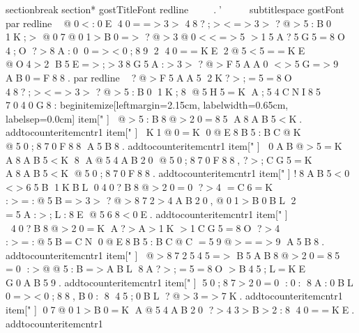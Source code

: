 
 
 
 
 \ s e c t i o n b r e a k   \ s e c t i o n * { 
 
 	 \ g o s t T i t l e F o n t 
 
 	 \ r e d l i n e 
 
 	 .'
 
 } 
 
 
 
 
 
 
 
 \ s u b t i t l e s p a c e 
 
 
 
 { \ g o s t F o n t 
 
 	 \ p a r   \ r e d l i n e     @0<:0E  40==>3>  48?;><=>3>  ?@>5:B0  1K;>  @07@01>B0=>  ?@>3@0<<=>5  >15A?5G5=8O  4;O  ?>8A:0  0=><0;89  2  40==KE  2@5<5==KE  @O4>2  B5E=>;>38G5A:>3>  ?@>F5AA0  <>5G=>9  AB0=F88.   
 
 	 \ p a r   \ r e d l i n e     ?@>F5AA5  2K?>;=5=8O  48?;><=>3>  ?@>5:B0  1K;8  @5H5=K  A;54CNI85  7040G8: 
 
 	 
 
 	 \ b e g i n { i t e m i z e } [ l e f t m a r g i n = 2 . 1 5 c m ,   l a b e l w i d t h = 0 . 6 5 c m ,   l a b e l s e p = 0 . 0 c m ]   
 
 	 	 
 
 	 	 \ i t e m [ "   ]   @>5:B8@>20=85  A8AB5<K. 	 	 
 
 	 	 \ a d d t o c o u n t e r { i t e m c n t r } { 1 } 
 
 	 	 
 
 	 	 \ i t e m [ "   ]   K1@0=K  0@E8B5:BC@K  @50;870F88  A5B8. 	 	 
 
 	 	 \ a d d t o c o u n t e r { i t e m c n t r } { 1 } 
 
 	 	 
 
 	 	 \ i t e m [ "   ]   0AB@>5=K  A8AB5<K  8  A@54AB20  @50;870F88,   ?>;CG5=K  A8AB5<K  @50;870F88.   	 	 
 
 	 	 \ a d d t o c o u n t e r { i t e m c n t r } { 1 } 
 
 	 	 
 
 	 	 \ i t e m [ "   ]   !8AB5<0  <>65B  1KBL  040?B8@>20=0  ?>4  =C6=K  :>=:@5B=>3>  ?@>872>4AB20,   @01>B0BL  2  =5A:>;L:8E  @568<0E. 	 	 
 
 	 	 \ a d d t o c o u n t e r { i t e m c n t r } { 1 } 
 
 	 	 
 
 	 	 \ i t e m [ "   ]   40?B8@>20=K  A?>A>1K  >1CG5=8O  ?>4  :>=:@5B=CN  0@E8B5:BC@C  =59@>==>9  A5B8. 	 	 
 
 	 	 \ a d d t o c o u n t e r { i t e m c n t r } { 1 } 
 
 	 	 
 
 	 	 \ i t e m [ "   ]   @>872545=>  B5AB8@>20=85  =0  :>@@5:B=>ABL  8A?>;=5=8O  >B45;L=KE  G0AB59. 	 	 
 
 	 	 \ a d d t o c o u n t e r { i t e m c n t r } { 1 } 
 
 	 	 
 
 	 	 \ i t e m [ "   ]    50;87>20=0  :0:  8A:0BL  0=><0;88,   B0:  8  45;0BL  ?@>3=>7K. 	 	 
 
 	 	 \ a d d t o c o u n t e r { i t e m c n t r } { 1 } 
 
 	 	 
 
 	 	 \ i t e m [ "   ]    07@01>B0=K  A@54AB20  ?>43>B>2:8  40==KE. 	 	 
 
 	 	 \ a d d t o c o u n t e r { i t e m c n t r } { 1 } 
}
